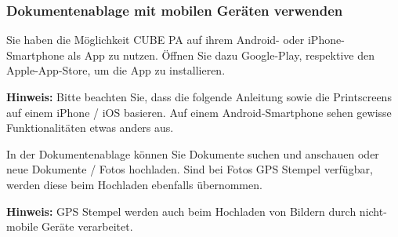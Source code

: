 \vspace{\baselineskip}
\vspace{\baselineskip}
\vspace{\baselineskip}
\vspace{\baselineskip}

\subsubsection{Dokumentenablage mit mobilen Geräten verwenden}

Sie haben die Möglichkeit CUBE PA auf ihrem Android- oder iPhone-Smartphone als App zu nutzen. Öffnen Sie dazu Google-Play, respektive den Apple-App-Store, um die App zu installieren.

\vspace{\baselineskip}

\textbf{Hinweis:} Bitte beachten Sie, dass die folgende Anleitung sowie die Printscreens auf einem iPhone / iOS basieren. Auf einem Android-Smartphone sehen gewisse Funktionalitäten etwas anders aus.

\vspace{\baselineskip}

In der Dokumentenablage können Sie Dokumente suchen und anschauen oder neue Dokumente / Fotos hochladen. Sind bei Fotos GPS Stempel verfügbar, werden diese beim Hochladen ebenfalls übernommen. 

\vspace{\baselineskip}

\textbf{Hinweis:} GPS Stempel werden auch beim Hochladen von Bildern durch nicht-mobile Geräte verarbeitet.

\vspace{\baselineskip}

